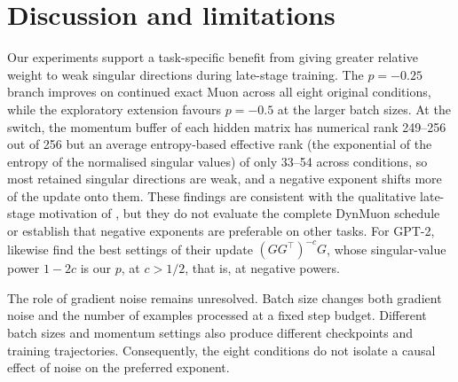 \documentclass[11pt,a4paper]{article}
\begin{document}
\section{Discussion and limitations}\label{sec:discussion}
Our experiments support a task-specific benefit from giving greater relative weight to weak singular directions during late-stage training. The $p=-0.25$ branch improves on continued exact Muon across all eight original conditions, while the exploratory extension favours $p=-0.5$ at the larger batch sizes. At the switch, the momentum buffer of each hidden matrix has numerical rank 249--256 out of 256 but an average entropy-based effective rank (the exponential of the entropy of the normalised singular values) of only 33--54 across conditions, so most retained singular directions are weak, and a negative exponent shifts more of the update onto them. These findings are consistent with the qualitative late-stage motivation of \citet{wu2026dynmuon}, but they do not evaluate the complete DynMuon schedule or establish that negative exponents are preferable on other tasks. For GPT-2, \citet{shumaylov2026special} likewise find the best settings of their update $(GG^\top)^{-c}G$, whose singular-value power $1-2c$ is our $p$, at $c>1/2$, that is, at negative powers.

The role of gradient noise remains unresolved. Batch size changes both gradient noise and the number of examples processed at a fixed step budget. Different batch sizes and momentum settings also produce different checkpoints and training trajectories. Consequently, the eight conditions do not isolate a causal effect of noise on the preferred exponent.
\end{document}
